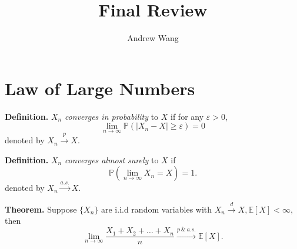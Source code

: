 \documentclass{article}
\title{Final Review}
\author{Andrew Wang}
\begin{document}
\maketitle
 
\section{Law of Large Numbers}

\textbf{Definition.} $X_n$ \emph{converges in probability} to $X$ if
                     for any $\varepsilon > 0$,
                     $$\lim_{n \to \infty}\mathbb{P}(|X_n-X| \geq \varepsilon) = 0 $$
                     denoted by $X_n \xrightarrow{p} X $.

\par

\textbf{Definition.} $X_n$ \emph{converges almost surely} to $X$ if 
                     $$\mathbb{P}(\lim_{n \to \infty}X_n = X) = 1.$$
                     denoted by $X_n \xrightarrow{a.s.} X.$

\textbf{Theorem.} Suppose $\{X_n\}$ are i.i.d random variables with $X_n \xrightarrow{d} X, \mathbb{E}[X] < \infty$, then
$$\lim_{n \to \infty}\frac{X_1 + X_2 + \dots +X_n}{n} \xrightarrow{p \ \& \ a.s.} \mathbb{E}[X].$$
\end{document}
